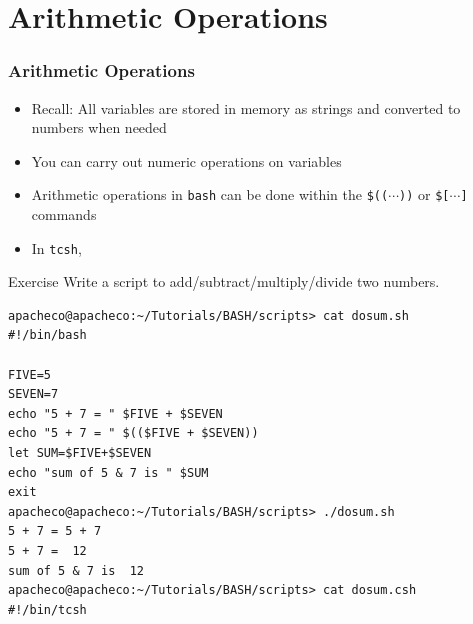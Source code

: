 \documentclass[slidestop,mathserif,compress,xcolor=svgnames]{beamer}
\newenvironment{bblock}[0]
{
\begin{beamerboxesrounded}[upper=uppercol1,lower=lowercol1,shadow=true]}
{\end{beamerboxesrounded}}
\begin{document}
\section{Arithmetic Operations}
\begin{frame}
  \frametitle{\small Arithmetic Operations}
  \begin{itemize}
    \item Recall: All variables are stored in memory as strings and converted to numbers when needed
    \item You can carry out numeric operations on variables
    \item Arithmetic operations in \texttt{bash} can be done within the \texttt{\$(($\cdots$))} or \texttt{\$[$\cdots$]} commands
    \begin{enumerate}
      \fontsize{7}{10}
    \end{enumerate}
    \item In \texttt{tcsh},
    \begin{enumerate}
      \fontsize{7}{10}
    \end{enumerate}
  \end{itemize}
  \begin{bblock}{Exercise}
    Write a script to add/subtract/multiply/divide two numbers.
  \end{bblock}
  \framebreak
  {\tiny
    \begin{verbatim}
apacheco@apacheco:~/Tutorials/BASH/scripts> cat dosum.sh
#!/bin/bash

FIVE=5
SEVEN=7
echo "5 + 7 = " $FIVE + $SEVEN
echo "5 + 7 = " $(($FIVE + $SEVEN))
let SUM=$FIVE+$SEVEN
echo "sum of 5 & 7 is " $SUM
exit
apacheco@apacheco:~/Tutorials/BASH/scripts> ./dosum.sh 
5 + 7 = 5 + 7
5 + 7 =  12
sum of 5 & 7 is  12
apacheco@apacheco:~/Tutorials/BASH/scripts> cat dosum.csh
#!/bin/tcsh


\end{verbatim}}
\end{frame}
\end{document}
